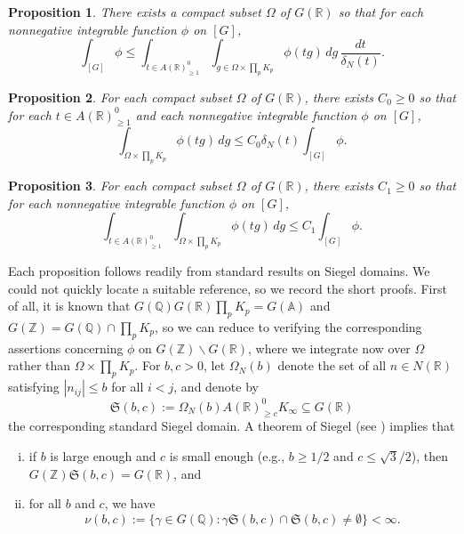 \documentclass[reqno]{amsart}
\theoremstyle{plain} \newtheorem{theorem} {Theorem}
\newtheorem{proposition} [theorem] {Proposition}
\theoremstyle{definition} \newtheorem{definition} [theorem] {Definition}
\theoremstyle{itplain} %
\numberwithin{equation}{section}
\numberwithin{theorem}{section}
\renewcommand{\geq}{\geqslant}
\renewcommand{\leq}{\leqslant}
\begin{document}
\begin{proposition}\label{prop:siegel-upper}
  There exists a compact subset $\Omega$ of $G(\mathbb{R})$ so that for each nonnegative integrable function $\phi$ on $[G]$,
  \begin{equation*}
    \int _{[G]} \phi \leq \int _{t \in A(\mathbb{R})_{\geq 1}^0} \int _{g \in \Omega \times \prod_p K_p} \phi(t g) \, d g \, \frac{d t}{\delta_N(t)}.
  \end{equation*}
\end{proposition}
\begin{proposition}\label{prop:siegel-lower}
  For each compact subset $\Omega$ of $G(\mathbb{R})$, there exists $C_0 \geq 0$ so that for each $t \in A(\mathbb{R})^0_{\geq 1}$ and each nonnegative integrable function $\phi$ on $[G]$,
  \begin{equation*}
    \int _{\Omega \times \prod_p K_p} \phi(t g) \, d g
    \leq C_0 \delta_N(t) \int _{[G]} \phi.
  \end{equation*}
\end{proposition}
\begin{proposition}\label{prop:siegel-lower-integrated}
  For each compact subset $\Omega$ of $G(\mathbb{R})$, there exists $C_1 \geq 0$ so that for each nonnegative integrable function $\phi$ on $[G]$,
  \begin{equation*}
    \int _{t \in A(\mathbb{R})_{\geq 1}^0} \int _{\Omega \times \prod_p K_p} \phi(t g) \, d g
    \leq C_1 \int _{[G]} \phi.
  \end{equation*}
\end{proposition}
Each proposition follows readily from standard results on Siegel domains.  We could not quickly locate a suitable reference, so we record the short proofs.  First of all, it is known that $G(\mathbb{Q}) G(\mathbb{R}) \prod_p K_p = G(\mathbb{A})$ \cite[Prop 2.2]{MR202718} and $G(\mathbb{Z}) = G(\mathbb{Q}) \cap \prod_p K_p$, so we can reduce to verifying the corresponding assertions concerning $\phi$ on $G(\mathbb{Z}) \backslash G(\mathbb{R})$, where we integrate now over $\Omega$ rather than $\Omega \times \prod_p K_p$.  For $b, c > 0$, let $\Omega_N(b)$ denote the set of all $n \in N(\mathbb{R})$ satisfying $|n_{i j}| \leq b$ for all $i < j$, and denote by
\begin{equation*}
\mathfrak{S}(b,c) := \Omega_N(b) A(\mathbb{R})^0_{\geq c} K_\infty  \subseteq G(\mathbb{R})
\end{equation*}
the corresponding standard Siegel domain.  A theorem of Siegel (see \cite[Prop 4.5]{MR147566}) implies that
\begin{enumerate}[(i)]
\item \label{itm:standard2:b-c-large-enough} if $b$ is large enough and $c$ is small enough (e.g., $b \geq 1/2$ and $c \leq \sqrt{3}/2$), then $G(\mathbb{Z}) \mathfrak{S}(b,c) = G(\mathbb{R})$, and
\item for all $b$ and $c$, we have
  \begin{equation}\label{eq:nubc}
    \nu(b,c) := \{\gamma \in G(\mathbb{Q}) : \gamma \mathfrak{S}(b,c) \cap \mathfrak{S}(b,c) \neq \emptyset \} < \infty.
  \end{equation}
\end{enumerate}
\end{document}

